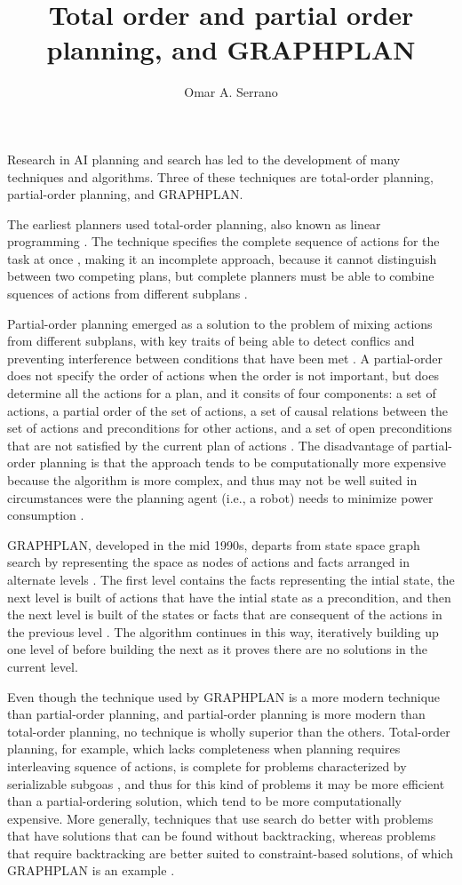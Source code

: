 \documentclass[10pt,a4paper]{article}
\title{Total order and partial order planning, and GRAPHPLAN}
\author{Omar A. Serrano}
\begin{document}
\maketitle

Research in AI planning and search has led to the development of many techniques and algorithms. Three of these techniques are total-order planning, partial-order planning, and GRAPHPLAN.

The earliest planners used total-order planning, also known as linear programming \cite{1}. The technique specifies the complete sequence of actions for the task at once \cite{2}, making it an incomplete approach, because it cannot distinguish between two competing plans, but complete planners must be able to combine squences of actions from different subplans \cite{1}.

Partial-order planning emerged as a solution to the problem of mixing actions from different subplans, with key traits of being able to detect conflics and preventing interference between conditions that have been met \cite{1}. A partial-order does not specify the order of actions when the order is not important, but does determine all the actions for a plan, and it consits of four components: a set of actions, a partial order of the set of actions, a set of causal relations between the set of actions and preconditions for other actions, and a set of open preconditions that are not satisfied by the current plan of actions \cite{2}. The disadvantage of partial-order planning is that the approach tends to be computationally more expensive because the algorithm is more complex, and thus may not be well suited in circumstances were the planning agent (i.e., a robot) needs to minimize power consumption \cite{2}.

GRAPHPLAN, developed in the mid 1990s, departs from state space graph search by representing the space as nodes of actions and facts arranged in alternate levels \cite{3}. The first level contains the facts representing the intial state, the next level is built of actions that have the intial state as a precondition, and then the next level is built of the states or facts that are consequent of the actions in the previous level \cite{3}. The algorithm continues in this way, iteratively building up one level of before building the next as it proves there are no solutions in the current level.

Even though the technique used by GRAPHPLAN is a more modern technique than partial-order planning, and partial-order planning is more modern than total-order planning, no technique is wholly superior than the others. Total-order planning, for example, which lacks completeness when planning requires interleaving squence of actions, is complete for problems characterized by serializable subgoas \cite{1}, and thus for this kind of problems it may be more efficient than a partial-ordering solution, which tend to be more computationally expensive. More generally, techniques that use search do better with problems that have solutions that can be found without backtracking, whereas problems that require backtracking are better suited to constraint-based solutions, of which GRAPHPLAN is an example \cite{1}.
\end{document}

